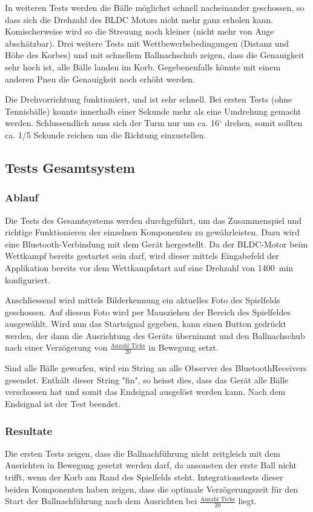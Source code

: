 \noindent
In weiteren Tests werden die Bälle möglichst schnell nacheinander geschossen, 
so dass sich die Drehzahl des BLDC Motors nicht mehr ganz erholen kann. 
Komischerweise wird so die Streuung noch kleiner (nicht mehr von Auge 
abschätzbar). Drei weitere Tests mit Wettbewerbsbedingungen (Distanz und Höhe 
des Korbes) und mit schnellem Ballnachschub zeigen, dass die Genauigkeit sehr 
hoch ist, alle Bälle landen im Korb. Gegebenenfalls könnte mit einem anderen 
Pneu die Genauigkeit noch erhöht werden.

\noindent
Die Drehvorrichtung funktioniert, und ist sehr schnell. Bei ersten Tests (ohne 
Tennisbälle) konnte innerhalb einer Sekunde mehr als eine Umdrehung gemacht 
werden. Schlussendlich muss sich der Turm nur um ca. 16$^\circ$ drehen, somit 
sollten ca. 1/5 Sekunde reichen um die Richtung einzustellen.



\subsection{Tests Gesamtsystem}
\subsubsection{Ablauf}
Die Tests des Gesamtsystems werden durchgeführt, um das Zusammenspiel und 
richtige Funktionieren der einzelnen Komponenten zu gewährleisten. Dazu wird 
eine Bluetooth-Verbindung mit dem Gerät hergestellt. Da der BLDC-Motor beim 
Wettkampf bereits gestartet sein darf, wird dieser mittels Eingabefeld der 
Applikation bereits vor dem Wettkampfstart auf eine Drehzahl von 
1400\si{\per\minute} konfiguriert.

\noindent
Anschliessend wird mittels Bilderkennung ein aktuelles Foto des Spielfelds 
geschossen. Auf diesem Foto wird per Mausziehen der Bereich des Spielfeldes 
ausgewählt. Wird nun das Startsignal gegeben, kann einen Button gedrückt 
werden, der dann die Ausrichtung des Geräts übernimmt und den Ballnachschub 
nach einer Verzögerung von $\frac{\text{Anzahl Ticks}}{20}$ in Bewegung setzt.

\noindent
Sind alle Bälle geworfen, wird ein String an alle Observer des 
BluetoothReceivers gesendet. Enthält dieser String "fin", so heisst dies, dass 
das Gerät alle Bälle verschossen hat und somit das Endsignal ausgelöst werden 
kann. Nach dem Endsignal ist der Test beendet.

\subsubsection{Resultate}
\noindent
Die ersten Tests zeigen, dass die Ballnachführung nicht zeitgleich mit 
dem Ausrichten in Bewegung gesetzt werden darf, da ansonsten der erste Ball 
nicht trifft, wenn der Korb am Rand des Spielfelds steht. Integrationstests 
dieser beiden Komponenten haben zeigen, dass die optimale Verzögerungszeit 
für den Start der Ballnachführung nach dem Ausrichten bei $\frac{\text{Anzahl 
Ticks}}{20}$ liegt. 

